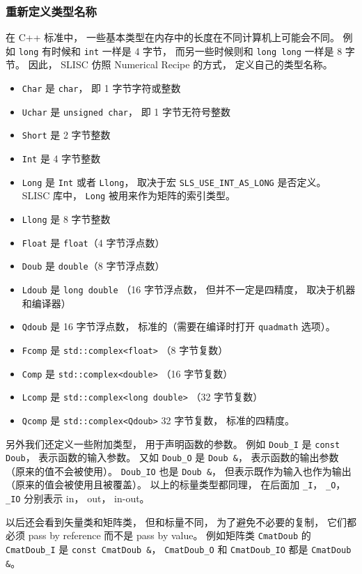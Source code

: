 \subsubsection{重新定义类型名称}
在 C++ 标准中， 一些基本类型在内存中的长度在不同计算机上可能会不同。 例如 \verb`long` 有时候和 \verb`int` 一样是 4 字节， 而另一些时候则和 \verb`long long` 一样是 8 字节。 因此， SLISC 仿照 Numerical Recipe \cite{NR3} 的方式， 定义自己的类型名称。
\begin{itemize}
\item \verb`Char` 是 \verb`char`， 即 1 字节字符或整数
\item \verb`Uchar` 是 \verb`unsigned char`， 即 1 字节无符号整数
\item \verb`Short` 是 2 字节整数
\item \verb`Int` 是 4 字节整数
\item \verb`Long` 是 \verb`Int` 或者 \verb`Llong`， 取决于宏 \verb`SLS_USE_INT_AS_LONG` 是否定义。 SLISC 库中， \verb`Long` 被用来作为矩阵的索引类型。
\item \verb`Llong` 是 8 字节整数
\item \verb`Float` 是 \verb`float`（4 字节浮点数）
\item \verb`Doub` 是 \verb`double`（8 字节浮点数）
\item \verb`Ldoub` 是 \verb`long double` （16 字节浮点数， 但并不一定是四精度， 取决于机器和编译器）
\item \verb`Qdoub` 是 16 字节浮点数， 标准的（需要在编译时打开 \verb`quadmath` 选项）。
\item \verb`Fcomp` 是 \verb`std::complex<float>` （8 字节复数）
\item \verb`Comp` 是 \verb`std::complex<double>` （16 字节复数）
\item \verb`Lcomp` 是 \verb`std::complex<long double>` （32 字节复数）
\item \verb`Qcomp` 是 \verb`std::complex<Qdoub>` 32 字节复数， 标准的四精度。
\end{itemize}
另外我们还定义一些附加类型， 用于声明函数的参数。 例如 \verb`Doub_I` 是 \verb`const Doub`， 表示函数的输入参数。 又如 \verb`Doub_O` 是 \verb`Doub &`， 表示函数的输出参数（原来的值不会被使用）。 \verb`Doub_IO` 也是 \verb`Doub &`， 但表示既作为输入也作为输出（原来的值会被使用且被覆盖）。 以上的标量类型都同理， 在后面加 \verb`_I`， \verb`_O`， \verb`_IO` 分别表示 in， out， in-out。

以后还会看到矢量类和矩阵类， 但和标量不同， 为了避免不必要的复制， 它们都必须 pass by reference 而不是 pass by value。 例如矩阵类 \verb`CmatDoub` 的 \verb`CmatDoub_I` 是 \verb`const CmatDoub &`， \verb`CmatDoub_O` 和 \verb`CmatDoub_IO` 都是 \verb`CmatDoub &`。
